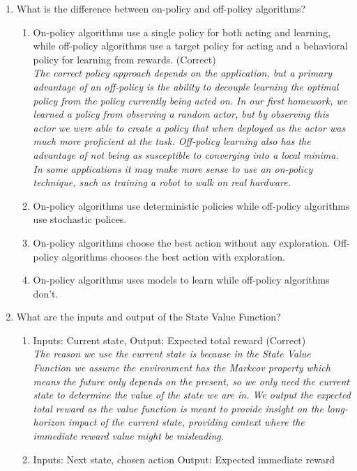 \documentclass{exam}
\begin{document}
\begin{enumerate}
    \item What is the difference between on-policy and off-policy algorithms?         
        \begin{enumerate}
            \item On-policy algorithms use a single policy for both acting and learning, while off-policy algorithms use a target policy for acting and a behavioral policy for learning from rewards. (Correct)\\
                \textit{The correct policy approach depends on the application, but a primary advantage of an off-policy is the ability to decouple learning the optimal policy from the policy currently being acted on. In our first homework, we learned a policy from observing a random actor, but by observing this actor we were able to create a policy that when deployed as the actor was much more proficient at the task. Off-policy learning also has the advantage of not being as susceptible to converging into a local minima. In some applications it may make more sense to use an on-policy technique, such as training a robot to walk on real hardware.}
            \item On-policy algorithms use deterministic policies while off-policy algorithms use stochastic polices.
            \item On-policy algorithms choose the best action without any exploration. Off-policy algorithms chooses the best action with exploration.
            \item On-policy algorithms uses models to learn while off-policy algorithms don't.
        \end{enumerate}
    \item What are the inputs and output of the State Value Function?
        \begin{enumerate}
            \item Inputs: Current state, Output: Expected total reward (Correct)\\
            \textit{The reason we use the current state is because in the State Value Function we assume
            the environment has the Markcov property which means the future only depends on the present, so we only need the current state to determine the value of the state we are in. We output the expected total reward as the value function is meant to provide insight on the long-horizon impact of the current state, providing context where the immediate reward value might be misleading.}
            \item Inputs: Next state, chosen action Output: Expected immediate reward

\end{enumerate}
\end{enumerate}
\end{document}
